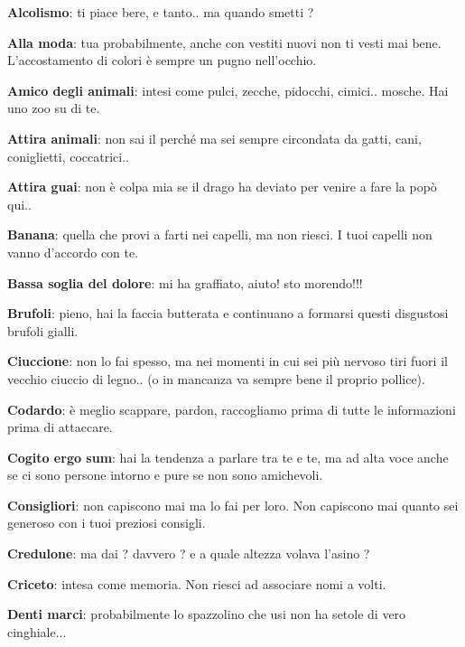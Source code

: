 \documentclass[a4paper,twoside,openany]{book}
\begin{document}
\begin{multicols}{2}


\textbf{Alcolismo}: ti piace bere, e tanto.. ma quando smetti ?

\textbf{Alla moda}: tua probabilmente, anche con vestiti nuovi non ti vesti mai bene. L'accostamento di colori è sempre un pugno nell'occhio.

\textbf{Amico degli animali}: intesi come pulci, zecche, pidocchi, cimici.. mosche. Hai uno zoo su di te.

\textbf{Attira animali}: non sai il perché ma sei sempre circondata da gatti, cani, coniglietti, coccatrici..

\textbf{Attira guai}: non è colpa mia se il drago ha deviato per venire a fare la popò qui..

\textbf{Banana}: quella che provi a farti nei capelli, ma non riesci. I tuoi capelli non vanno d'accordo con te.

\textbf{Bassa soglia del dolore}: mi ha graffiato, aiuto! sto morendo!!!

\textbf{Brufoli}: pieno, hai la faccia butterata e continuano a formarsi questi disgustosi brufoli gialli.

\textbf{Ciuccione}: non lo fai spesso, ma nei momenti in cui sei più nervoso tiri fuori il vecchio ciuccio di legno.. (o in mancanza va sempre bene il proprio pollice).

\textbf{Codardo}: è meglio scappare, pardon, raccogliamo prima di tutte le informazioni prima di attaccare.

\textbf{Cogito ergo sum}: hai la tendenza a parlare tra te e te, ma ad alta voce anche se ci sono persone intorno e pure se non sono amichevoli.

\textbf{Consigliori}: non capiscono mai ma lo fai per loro. Non capiscono mai quanto sei generoso con i tuoi preziosi consigli.

\textbf{Credulone}: ma dai ? davvero ? e a quale altezza volava l'asino ?

\textbf{Criceto}: intesa come memoria. Non riesci ad associare nomi a volti.

\textbf{Denti marci}: probabilmente lo spazzolino che usi non ha setole di vero cinghiale...


\end{multicols}
\end{document}
